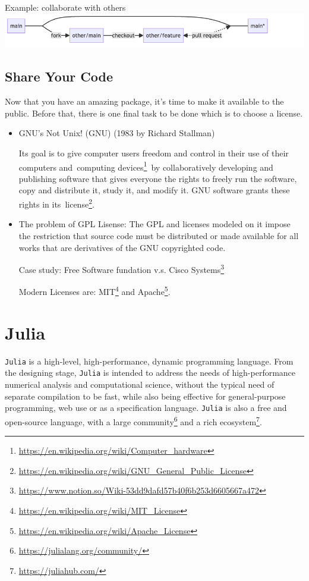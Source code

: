 \documentclass[
  notoc %
]{tufte-book}
\DeclareRobustCommand{\href}[2]{#2\footnote{\url{#1}}}
\newcommand{\passthrough}[1]{#1}
\begin{document}
Example: collaborate with others
\includegraphics{./assets/images/collab.png}

\hypertarget{share-your-code}{%
\section{Share Your Code}\label{share-your-code}}

Now that you have an amazing package, it's time to make it available to
the public. Before that, there is one final task to be done which is to
choose a license.

\begin{itemize}
\item
  GNU's Not Unix! (GNU) (1983 by Richard Stallman)

  Its goal is to give computer users freedom and control in their use of
  their computers
  and~\href{https://en.wikipedia.org/wiki/Computer_hardware}{computing
  devices}~by collaboratively developing and publishing software that
  gives everyone the rights to freely run the software, copy and
  distribute it, study it, and modify it. GNU software grants these
  rights in
  its~\href{https://en.wikipedia.org/wiki/GNU_General_Public_License}{license}.
\item
  The problem of GPL Lisense: The GPL and licenses modeled on it impose
  the restriction that source code must be distributed or made available
  for all works that are derivatives of the GNU copyrighted code.

  Case study:
  \href{https://www.notion.so/Wiki-53dd9dafd57b40f6b253d6605667a472}{Free
  Software fundation v.s. Cisco Systems}

  Modern Licenses are:
  \href{https://en.wikipedia.org/wiki/MIT_License}{MIT} and
  \href{https://en.wikipedia.org/wiki/Apache_License}{Apache}.
\end{itemize}

\hypertarget{sec:julia}{%
\chapter{Julia}\label{sec:julia}}

\passthrough{\lstinline!Julia!} is a high-level, high-performance,
dynamic programming language. From the designing stage,
\passthrough{\lstinline!Julia!} is intended to address the needs of
high-performance numerical analysis and computational science, without
the typical need of separate compilation to be fast, while also being
effective for general-purpose programming, web use or as a specification
language. \passthrough{\lstinline!Julia!} is also a free and open-source
language, with a \href{https://julialang.org/community/}{large
community} and a \href{https://juliahub.com/}{rich ecosystem}.
\end{document}
